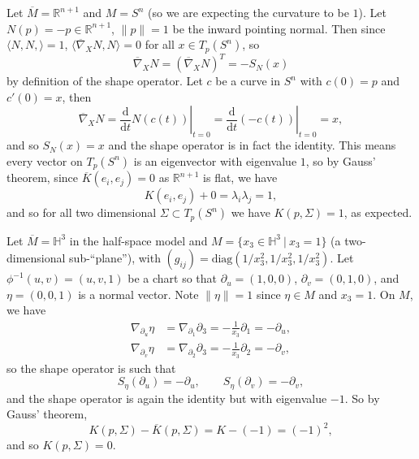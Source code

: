 \documentclass[letter-paper]{tufte-book}
\newenvironment{example}[1][Example]{\begin{trivlist}
\item[\hskip \labelsep {\bfseries #1}]}{\end{trivlist}}
\begin{document}
\begin{example}
  Let $\overline{M} = \mathbb{R}^{n+1}$ and $M = S^n$ (so we are expecting the curvature to be $1$). Let $N(p) = -p\in\mathbb{R}^{n+1}$, $\|p\|=1$ be the inward pointing normal. Then since $\langle N, N,\rangle = 1$, $\langle \overline{\nabla}_X N, N\rangle = 0$ for all $x \in T_p(S^n)$, so
  \begin{equation*}
    \overline{\nabla}_X N = (\overline{\nabla}_X N)^T = -S_N(x)
  \end{equation*}
  by definition of the shape operator. Let $c$ be a curve in $S^n$ with $c(0) = p$ and $c'(0) = x$, then
  \begin{equation*}
    \overline{\nabla}_X N = \left.\frac{\mathrm{d}}{\mathrm{d}t}N(c(t))\right|_{t=0} = \left.\frac{\mathrm{d}}{\mathrm{d}t}(-c(t))\right|_{t=0} = x,
  \end{equation*}
  and so $S_N(x) = x$ and the shape operator is in fact the identity. This means every vector on $T_p(S^n)$ is an eigenvector with eigenvalue $1$, so by Gauss' theorem, since $\overline{K}(e_i, e_j) = 0$ as $\mathbb{R}^{n+1}$ is flat, we have
  \begin{equation*}
    K(e_i, e_j) + 0 = \lambda_i \lambda_j = 1,
  \end{equation*}
  and so for all two dimensional $\Sigma \subset T_p(S^n)$ we have $K(p, \Sigma) = 1$, as expected.
\end{example}

\begin{example}
  Let $\overline{M} = \mathbb{H}^3$ in the half-space model and $M=\{x_3 \in \mathbb{H}^3\ |\ x_3 = 1\}$ (a two-dimensional sub-``plane''), with $(g_{ij}) = \mbox{diag}(1/x_3^2, 1/x_3^2, 1/x_3^2)$. Let $\phi^{-1}(u,v) = (u,v,1)$ be a chart so that $\partial_u = (1, 0, 0)$, $\partial_v = (0, 1, 0)$, and $\eta = (0,0,1)$ is a normal vector. Note $\|\eta\| = 1$ since $\eta\in M$ and $x_3 = 1$. On $M$, we have
  \begin{align*}
    \nabla_{\partial_u} \eta &= \nabla_{\partial_1} \partial_3 = -\frac{1}{x_3}\partial_1 = -\partial_u,\\
    \nabla_{\partial_v} \eta &= \nabla_{\partial_2} \partial_3 = -\frac{1}{x_3}\partial_2 = -\partial_v,
  \end{align*}
  so the shape operator is such that
  \begin{equation*}
    S_\eta(\partial_u) = -\partial_u, \qquad S_\eta(\partial_v) = -\partial_v,
  \end{equation*}
  and the shape operator is again the identity but with eigenvalue $-1$. So by Gauss' theorem,
  \begin{equation*}
    K(p,\Sigma) - \overline{K}(p, \Sigma) = K - (-1) = (-1)^2,
  \end{equation*}
  and so $K(p, \Sigma) = 0$. 
\end{example}
\end{document}
